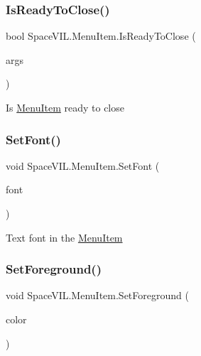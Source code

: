 \subsubsection{\texorpdfstring{Is\+Ready\+To\+Close()}{IsReadyToClose()}}
{\footnotesize\ttfamily bool Space\+V\+I\+L.\+Menu\+Item.\+Is\+Ready\+To\+Close (\begin{DoxyParamCaption}\item[{\mbox{\hyperlink{class_space_v_i_l_1_1_core_1_1_mouse_args}{Mouse\+Args}}}]{args }\end{DoxyParamCaption})}



Is \mbox{\hyperlink{class_space_v_i_l_1_1_menu_item}{Menu\+Item}} ready to close 

\mbox{\label{class_space_v_i_l_1_1_menu_item_a8f81cd6c91a758c5040c0fff74d803eb}} 
\subsubsection{\texorpdfstring{Set\+Font()}{SetFont()}}
{\footnotesize\ttfamily void Space\+V\+I\+L.\+Menu\+Item.\+Set\+Font (\begin{DoxyParamCaption}\item[{Font}]{font }\end{DoxyParamCaption})}



Text font in the \mbox{\hyperlink{class_space_v_i_l_1_1_menu_item}{Menu\+Item}} 

\mbox{\label{class_space_v_i_l_1_1_menu_item_ab66887ca29fcd817a4b4505e92e01919}} 
\subsubsection{\texorpdfstring{Set\+Foreground()}{SetForeground()}}
{\footnotesize\ttfamily void Space\+V\+I\+L.\+Menu\+Item.\+Set\+Foreground (\begin{DoxyParamCaption}\item[{Color}]{color }\end{DoxyParamCaption})}



